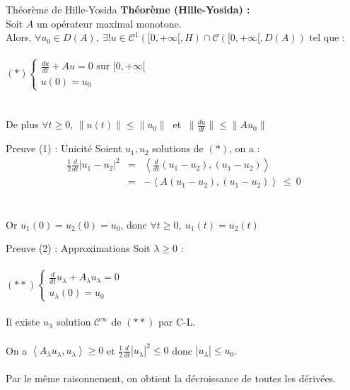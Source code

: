 \documentclass[10pt]{beamer}
\begin{document}
\begin{frame}{Théorème de Hille-Yosida}
\textbf{Théorème (Hille-Yosida) : \\}
Soit $A$ un opérateur maximal monotone.\\
 Alors, $\forall u_0 \in D(A), \ \exists ! u \in \mathcal{C}^1([0,+\infty[,H) \cap\mathcal{C}([0,+\infty[,D(A)) $ tel que : \\ ~ \\
$(*) \begin{cases}\displaystyle \frac{du}{dt} +Au = 0 \text{\ \ \ \ sur } [0,+\infty[ \\ u(0)=u_0 \end{cases}$ \\ ~ \\ ~ \\
De plus  $\forall t \geq 0$, $\|u(t)\|\leq \|u_0\| \ $ et $\ \displaystyle \|\frac{du}{dt}\| \leq  \|Au_0\|$
\end{frame}


\begin{frame}{Preuve (1) : Unicité}
Soient $u_1,u_2$ solutions de $(*)$, on a : 
\begin{eqnarray*}  \frac{1}{2}\frac{d}{dt}|u_1-u_2|^2  &=& \left< \frac{d}{dt}(u_1-u_2),(u_1-u_2)\right> \\
&=&-\left< A(u_1-u_2),(u_1-u_2)\right> \ \leq \ 0
\end{eqnarray*}
\\ ~ \\
Or $u_1(0)=u_2(0)=u_0$, donc $ \forall t \geq 0, \ u_1(t)=u_2(t)$
\end{frame}


\begin{frame}{Preuve (2) : Approximations}
Soit $\lambda \geq 0$ : \\ ~ \\
$(**) \begin{cases}\displaystyle \frac{d}{dt}u_\lambda +A_\lambda u_\lambda = 0 \\ u_\lambda(0)=u_0 \end{cases}$ \\ ~ \\ 
Il existe $u_\lambda$ solution $\mathcal{C}^\infty$ de $(**)$ par C-L. \\ ~ \\ 
On a $\left< A_\lambda u_\lambda,u_\lambda\right> \geq 0$ et $\frac{1}{2}\frac{d}{dt}|u_\lambda|^2 \leq 0$ donc $|u_\lambda|\leq u_0$. \\ ~ \\
Par le même raisonnement, on obtient la décroissance de toutes les dérivées.
\end{frame}
\end{document}

